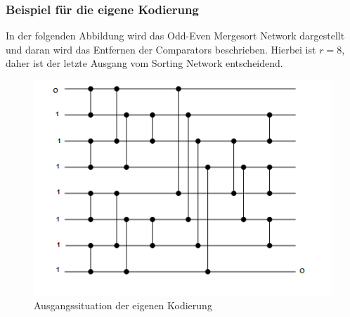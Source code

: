 \documentclass[a4,abstract=on]{scrartcl}
\begin{document}

\subsubsection{Beispiel für die eigene Kodierung}
In der folgenden Abbildung wird das Odd-Even Mergesort Network dargestellt und daran wird das Entfernen der Comparators beschrieben. Hierbei ist $r=8$, daher ist der letzte Ausgang vom Sorting Network entscheidend.

\begin{figure}[H]
\centering
\includegraphics[width=\textwidth]{ownSorting_start.png}
\caption{Ausgangssituation der eigenen Kodierung}
\label{fig:ownSorting}
\end{figure}
\end{document}
